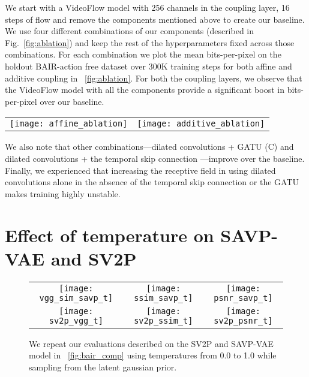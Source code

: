 \documentclass{article} \usepackage{iclr2020_conference,times}
\newcommand{\figref}[1]{\figurename~\ref{#1}}
\begin{document}
We start with a VideoFlow model with 256 channels in the coupling layer, 16 steps of flow and remove the components mentioned above to create our baseline. We use four different combinations of our components (described in Fig.~\ref{fig:ablation}) and keep the rest of the hyperparameters fixed across those combinations. For each combination we plot the mean bits-per-pixel on the holdout BAIR-action free dataset over 300K training steps for both affine and additive coupling in \figref{fig:ablation}. 
For both the coupling layers, we observe that the VideoFlow model with all the components provide a significant boost in bits-per-pixel over our baseline.

\begin{figure*}[h]
\begin{tabular}{cc}
\centering
\texttt{[image: affine\_ablation]} &
\texttt{[image: additive\_ablation]} \\
\end{tabular}
\caption{\textbf{B: baseline}, \textbf{A: Temporal Skip Connection}, \textbf{C: Dilated Convolutions + GATU}, \textbf{D: Dilation Convolutions + Temporal Skip Connection}, \textbf{E: Dilation Convolutions + Temporal Skip Connection + GATU}. We plot the holdout bits-per-pixel on the BAIR action-free dataset for different ablations of our VideoFlow model.}
\label{fig:ablation}
\end{figure*}

We also note that other combinations---dilated convolutions + GATU (C) and dilated convolutions + the temporal skip connection ---improve over the baseline. Finally, we experienced that increasing the receptive field in  using dilated convolutions alone in the absence of the temporal skip connection or the GATU makes training highly unstable.

\section{Effect of temperature on SAVP-VAE and SV2P}

\begin{figure}[h]
\begin{tabular}{ccc}
\texttt{[image: vgg\_sim\_savp\_t]} &
\texttt{[image: ssim\_savp\_t]} & \texttt{[image: psnr\_savp\_t]} \\
\texttt{[image: sv2p\_vgg\_t]} &
\texttt{[image: sv2p\_ssim\_t]} & \texttt{[image: sv2p\_psnr\_t]} \\
\end{tabular}
\caption{We repeat our evaluations described on the SV2P and SAVP-VAE model in \figref{fig:bair_comp} using temperatures from 0.0 to 1.0 while sampling from the latent gaussian prior.}
\label{fig:temp_video_vae}
\end{figure}
\end{document}
